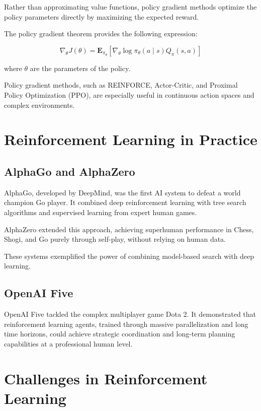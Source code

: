 \documentclass[openany]{book}
\begin{document}
Rather than approximating value functions, policy gradient methods optimize the 
policy parameters directly by maximizing the expected reward.

The policy gradient theorem provides the following expression:

\[
\nabla_\theta J(\theta) = \mathbf{E}_{\pi_\theta} \left[ \nabla_\theta \log 
\pi_\theta(a \mid s) Q_\pi(s,a) \right]
\]

where \( \theta \) are the parameters of the policy.

Policy gradient methods, such as REINFORCE, Actor-Critic, and Proximal Policy
 Optimization (PPO), are especially useful in continuous action spaces and 
 complex environments.

\section{Reinforcement Learning in Practice}

\subsection{AlphaGo and AlphaZero}

AlphaGo, developed by DeepMind, was the first AI system to defeat a world 
champion Go player. It combined deep reinforcement learning with tree search 
algorithms and supervised learning from expert human games.

AlphaZero extended this approach, achieving superhuman performance in Chess, 
Shogi, and Go purely through self-play, without relying on human data.

These systems exemplified the power of combining model-based search with deep 
learning.

\subsection{OpenAI Five}

OpenAI Five tackled the complex multiplayer game Dota 2. It demonstrated that 
reinforcement learning agents, trained through massive parallelization and long 
time horizons, could achieve strategic coordination and long-term planning 
capabilities at a professional human level.

\section{Challenges in Reinforcement Learning}
\end{document}
